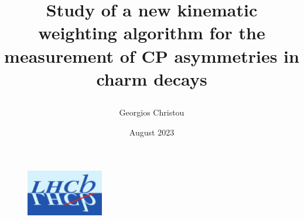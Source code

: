 \documentclass{report}
\title{
        \textbf{Study of a new kinematic weighting algorithm for the measurement of CP asymmetries in charm decays}

}
\author{Georgios Christou}
\date{August 2023}
\begin{document}
        \maketitle

        \begin{figure}[h!]
                \centering
                \includegraphics[width = 0.3\textwidth]{../.images/Lhcb-logo-new.svg.png}
        \end{figure}
\end{document}
